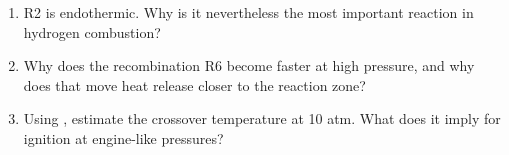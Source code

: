 \begin{selfcheck}
\begin{enumerate}
  \item R2 is endothermic. Why is it nevertheless the most important reaction in hydrogen combustion?
  \item Why does the recombination R6 become faster at high pressure, and why does that move heat
        release closer to the reaction zone?
  \item Using , estimate the crossover temperature at 10 atm. What does it imply
        for ignition at engine-like pressures?
\end{enumerate}
\end{selfcheck}
